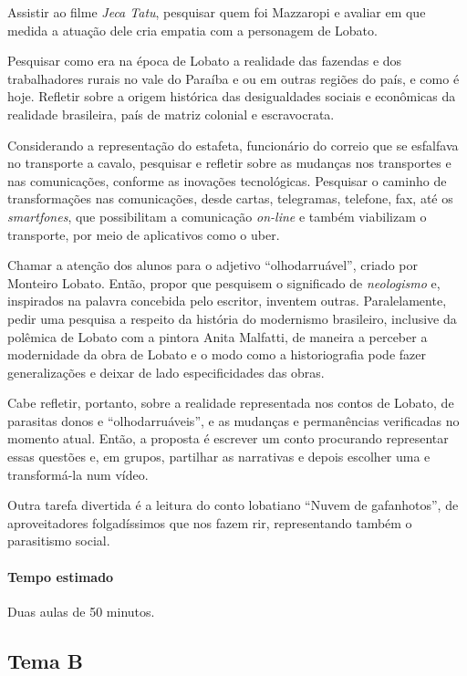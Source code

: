 \documentclass[12pt]{extarticle}
\begin{document}
Assistir ao filme \emph{Jeca Tatu}, pesquisar quem foi Mazzaropi e
avaliar em que medida a atuação dele cria empatia com a personagem de
Lobato.

Pesquisar como era na época de Lobato a realidade das fazendas e dos
trabalhadores rurais no vale do Paraíba e ou em outras regiões do país,
e como é hoje. Refletir sobre a origem histórica das desigualdades
sociais e econômicas da realidade brasileira, país de matriz colonial e
escravocrata.

Considerando a representação do estafeta, funcionário do correio que se
esfalfava no transporte a cavalo, pesquisar e refletir sobre as mudanças
nos transportes e nas comunicações, conforme as inovações tecnológicas.
Pesquisar o caminho de transformações nas comunicações, desde cartas,
telegramas, telefone, fax, até os \emph{smartfones}, que possibilitam a
comunicação \emph{on-line} e também viabilizam o transporte, por meio de
aplicativos como o uber.

Chamar a atenção dos alunos para o adjetivo ``olhodarruável'', criado
por Monteiro Lobato. Então, propor que pesquisem o significado de
\emph{neologismo} e, inspirados na palavra concebida pelo escritor,
inventem outras. Paralelamente, pedir uma pesquisa a respeito da
história do modernismo brasileiro, inclusive da polêmica de Lobato com a
pintora Anita Malfatti, de maneira a perceber a modernidade da obra de
Lobato e o modo como a historiografia pode fazer generalizações e deixar
de lado especificidades das obras.

Cabe refletir, portanto, sobre a realidade representada nos contos de
Lobato, de parasitas donos e ``olhodarruáveis'', e as mudanças e
permanências verificadas no momento atual. Então, a proposta é escrever
um conto procurando representar essas questões e, em grupos, partilhar
as narrativas e depois escolher uma e transformá-la num vídeo.

Outra tarefa divertida é a leitura do conto lobatiano ``Nuvem de
gafanhotos'', de aproveitadores folgadíssimos que nos fazem rir,
representando também o parasitismo social.

\paragraph{Tempo estimado} Duas aulas de 50 minutos.

\subsection{Tema B}
\end{document}
